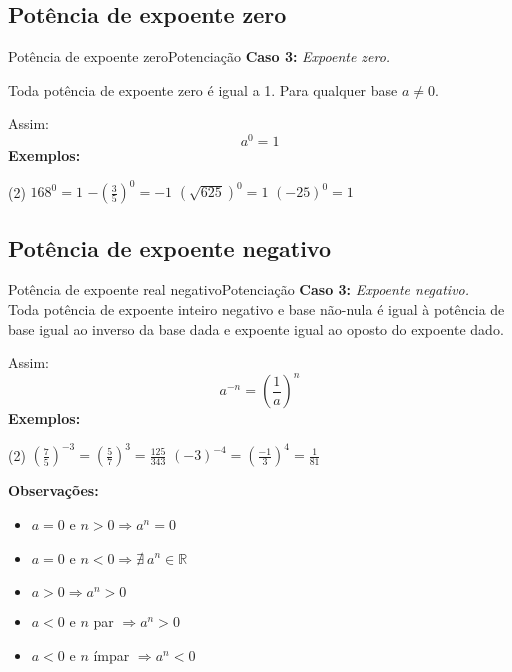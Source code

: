 \documentclass[aspectratio=169,11pt]{uu-beamer}
\begin{document}
\subsection{Potência de expoente zero}
    \begin{frame}{Potência de expoente zero}{Potenciação}
        \textbf{Caso 3:} \textit{Expoente zero.}
        
        
            Toda potência de expoente zero é igual a 1. Para qualquer base \(a \neq 0\).
            
            Assim:
                \[ a^0 = 1 \]
            \textbf{Exemplos:}
                \begin{tasks}(2)
                    \task \( 168^0 = 1 \)
                    \task \( - \left( \frac{3}{5} \right)^0 = -1 \)
                    \task \( \left( \sqrt{625} \right)^0 = 1 \)
                    \task \( (-25)^0 = 1 \)
                \end{tasks}
    \end{frame}
\subsection{Potência de expoente negativo}
    \begin{frame}{Potência de expoente real negativo}{Potenciação}
        \textbf{Caso 3:} \textit{Expoente negativo.}
            \vspace{.1cm} 
            \\
            Toda potência de expoente inteiro negativo e base não-nula é igual à potência de base igual ao inverso da base dada e expoente igual ao oposto do expoente dado.
            
            Assim:
                \[ a^{-n} = \left( \frac{1}{a} \right)^n \]
            \textbf{Exemplos:}
                \begin{tasks}(2)
                    \task \( \left( \frac{7}{5} \right)^{-3} = \left( \frac{5}{7} \right)^{3} = \frac{125}{343}\)
                    \task \( \left( -3 \right)^{-4} = \left( \frac{-1}{3} \right)^4 = \frac{1}{81} \)
                \end{tasks}
                \vspace{.3cm}
\pause
            \textbf{Observações:}
                \begin{multicols}{2}
                \begin{itemize}
                    \item \(a = 0\) e \( n > 0 \Rightarrow a^n = 0\)
                    \item \(a = 0\) e \( n < 0 \Rightarrow \nexists~ a^n \in \mathbb{R}\)
                    \item \(a > 0 \Rightarrow a^n > 0\)
                    \item \( a < 0\) e \(n\) par \(\Rightarrow a^n > 0\)
                    \item \(a < 0\) e \(n\) ímpar \(\Rightarrow a^n < 0\)
                \end{itemize}
                \end{multicols}
    \end{frame}
    
\end{document}

